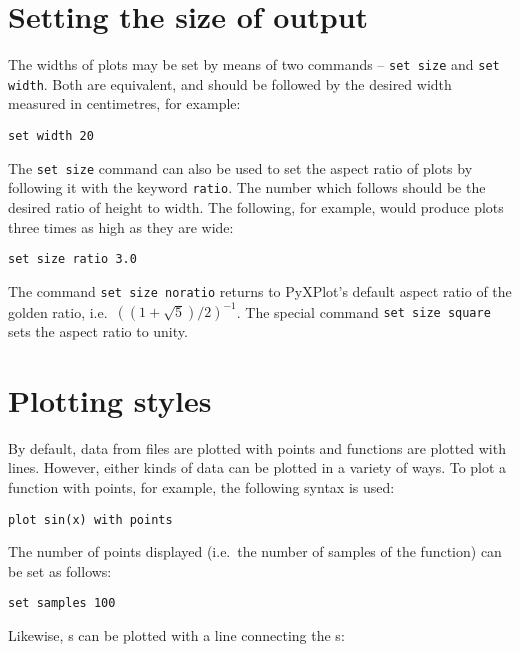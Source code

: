 \section{Setting the size of output}

The widths of plots may be set by means of two commands -- {\tt set
size} and {\tt set width}. Both are
equivalent, and should be followed by the desired width measured in
centimetres, for example:

\begin{verbatim}
set width 20
\end{verbatim}

The {\tt set size} command can also be used to set the aspect ratio of plots by
following it with the keyword {\tt ratio}. The number
which follows should be the desired ratio of height to width. The following,
for example, would produce plots three times as high as they are wide:

\begin{verbatim}
set size ratio 3.0
\end{verbatim}

\noindent The command {\tt set size noratio} returns to PyXPlot's default
aspect ratio of the golden ratio, i.e.\ $\left((1+\sqrt{5})/2\right)^{-1}$. The
special command {\tt set size square} sets the aspect
ratio to unity.

\section{Plotting styles}
\label{sec:plotting_styles}

By default, data from files are plotted with points and functions are plotted
with lines. However, either kinds of data can be plotted in a variety of ways.
To plot a function with points, for example, the following syntax is used:

\begin{verbatim}
plot sin(x) with points
\end{verbatim}

\noindent The number of points displayed (i.e.\ the number of samples of the
function) can be set as follows:

\begin{verbatim}
set samples 100
\end{verbatim}

\noindent Likewise, \datafile s can be plotted with a line connecting the
\datapoint s:

